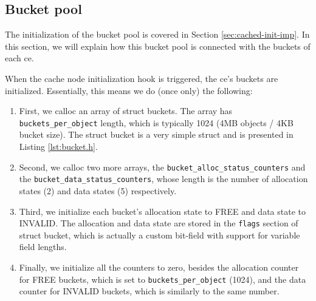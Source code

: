 \begin{comment}
The \textbf{status}, \textbf{bucket\_alloc\_status\_counters} and 
\textbf{bucket\_data\_status\_counters} are the ce status and the counters for 
the ce's bucket statuses respectively, which are explained thoroughly in 
Section \ref{cached-states-design}. The \textbf{lock} and \textbf{workq} are 
used for concurrency control over parallel access to the ce's data. Moreover, 
the \textbf{pending\_waitq} is an xwaitq where all requests that can't be 
completed due to the current state of ce are kept. Finally, the 
\textbf{buckets} field is associated with our bucket pool.
\end{comment}

\subsection{Bucket pool}\label{sec:cached-bucket-imp}

The initialization of the bucket pool is covered in Section 
\ref{sec:cached-init-imp}. In this section, we will explain how this bucket 
pool is connected with the buckets of each ce.

When the cache node initialization hook is triggered, the ce's buckets are 
initialized. Essentially, this means we do (once only) the following:

\begin{enumerate}
	\item First, we calloc an array of struct buckets. The array has
		\texttt{buckets\_per\_object} length, which is typically 1024 
		(4MB objects / 4KB bucket size). The struct bucket is a very 
		simple struct and is presented in Listing 
		\ref{lst:bucket.h}.
		

	\item Second, we calloc two more arrays, the  
		\texttt{bucket\_alloc\_status\_counters} and the
		\texttt{bucket\_data\_status\_counters}, whose length is the 
		number of allocation states (2) and data states (5) 
		respectively.
	\item Third, we initialize each bucket's allocation state to FREE and 
		data state to INVALID. The allocation and data state are stored 
		in the \texttt{flags} section of struct bucket, which is 
		actually a custom bit-field with support for variable field 
		lengths.
	\item Finally, we initialize all the counters to zero, besides the 
		allocation counter for FREE buckets, which is set to 
		\texttt{buckets\_per\_object} (1024), and the data counter for 
		INVALID buckets, which is similarly to the same number.
\end{enumerate}

